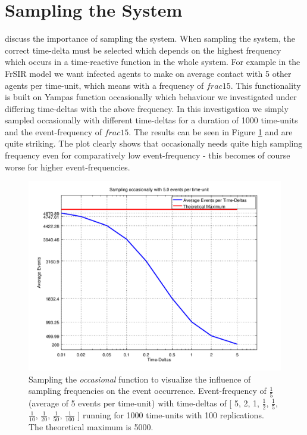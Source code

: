 \section{Sampling the System}
discuss the importance of sampling the system. When sampling the system, the correct time-delta must be selected which depends on the highest frequency which occurs in a time-reactive function in the whole system. For example in the FrSIR model we want infected agents to make on average contact with 5 other agents per time-unit, which means with a frequency of $frac{1}{5}$. This functionality is built on Yampas function occasionally which behaviour we investigated under differing time-deltas with the above frequency. In this investigation we simply sampled occasionally with different time-deltas for a duration of 1000 time-units and the event-frequency of $frac{1}{5}$. The results can be seen in Figure \ref{fig:sampling_occasionally_5evts} and are quite striking. The plot clearly shows that occasionally needs quite high sampling frequency even for comparatively low event-frequency - this becomes of course worse for higher event-frequencies.

\begin{figure}
	\centering
	\includegraphics[width=.6\textwidth, angle=0]{./../shared/fig/samplingTest_occasionally_5evts.png}
	\caption{Sampling the \textit{occasional} function to visualize the influence of sampling frequencies on the event occurrence. Event-frequency of $\frac{1}{5}$ (average of 5 events per time-unit) with time-deltas of [ 5, 2, 1, $\frac{1}{2}$, $\frac{1}{5}$, $\frac{1}{10}$, $\frac{1}{20}$, $\frac{1}{50}$, $\frac{1}{100}$ ] running for 1000 time-units with 100 replications. The theoretical maximum is 5000.}
	\label{fig:sampling_occasionally_5evts}
\end{figure}

